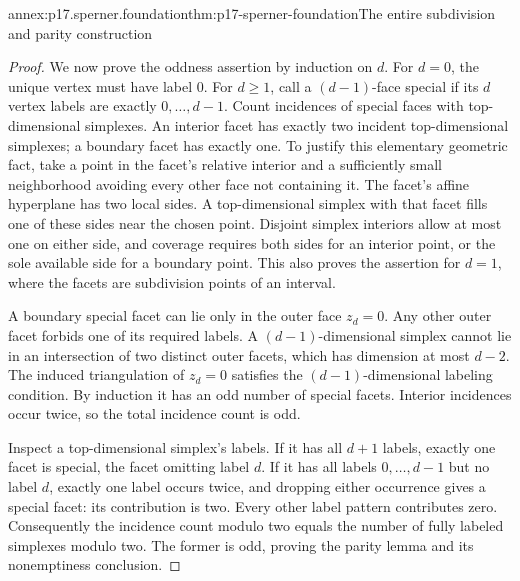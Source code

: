 \begin{annexitem}{annex:p17.sperner.foundation}{thm:p17-sperner-foundation}{The entire subdivision and parity construction}
\begin{proof}
We now prove the oddness assertion by induction
on \(d\). For \(d=0\), the unique vertex must have
label 0. For \(d\geq1\), call a \((d-1)\)-face
special if its \(d\) vertex labels are exactly
\(0,\ldots,d-1\).
Count incidences of special faces with top-dimensional
simplexes. An interior facet has exactly two
incident top-dimensional simplexes; a boundary
facet has exactly one. To justify this elementary
geometric fact, take a point in the facet's relative
interior and a sufficiently small neighborhood
avoiding every other face not containing it.
The facet's affine hyperplane has two local sides.
A top-dimensional simplex with that facet fills
one of these sides near the chosen point.
Disjoint simplex interiors allow at most one
on either side, and coverage requires both
sides for an interior point, or the sole available
side for a boundary point. This also proves
the assertion for \(d=1\), where the facets
are subdivision points of an interval.

A boundary special facet can lie only in the
outer face \(z_d=0\). Any other outer facet
forbids one of its required labels. A
\((d-1)\)-dimensional simplex cannot lie in
an intersection of two distinct outer facets,
which has dimension at most \(d-2\).
The induced triangulation of \(z_d=0\) satisfies
the \((d-1)\)-dimensional labeling condition.
By induction it has an odd number of special
facets. Interior incidences occur twice, so
the total incidence count is odd.

Inspect a top-dimensional simplex's labels.
If it has all \(d+1\) labels, exactly one
facet is special, the facet omitting label \(d\).
If it has all labels \(0,\ldots,d-1\) but
no label \(d\), exactly one label occurs twice,
and dropping either occurrence gives a special
facet: its contribution is two.
Every other label pattern contributes zero.
Consequently the incidence count modulo two
equals the number of fully labeled simplexes
modulo two. The former is odd, proving the
parity lemma and its nonemptiness conclusion.
\end{proof}
\end{annexitem}

